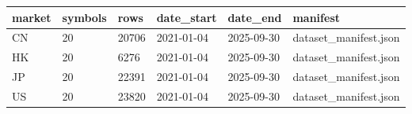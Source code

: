 \begin{tabular}{llllll}
\toprule
market & symbols & rows & date\_start & date\_end & manifest \\
\midrule
CN & 20 & 20706 & 2021-01-04 & 2025-09-30 & dataset\_manifest.json \\
HK & 20 & 6276 & 2021-01-04 & 2025-09-30 & dataset\_manifest.json \\
JP & 20 & 22391 & 2021-01-04 & 2025-09-30 & dataset\_manifest.json \\
US & 20 & 23820 & 2021-01-04 & 2025-09-30 & dataset\_manifest.json \\
\bottomrule
\end{tabular}
